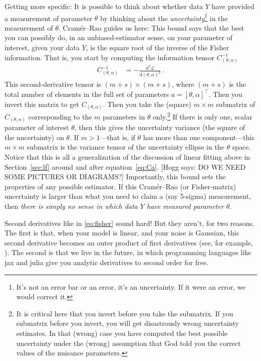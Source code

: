 \documentclass{article}
\newcommand{\sectionname}{Section}
\newcommand{\secref}[1]{\sectionname~\ref{#1}}
\newcommand{\dd}{\mathrm{d}}
\newcommand{\hogg}[1]{{\color{blue}[Hogg says: {#1}]}}
\begin{document}
Getting more specific:
It is possible to think about whether data $Y$ have provided a measurement of parameter $\theta$ by thinking about the \emph{uncertainty}\footnote{%
It's not an error bar or an error, it's an uncertainty. If it were an error, we would correct it.}
in the measurement of $\theta$.
Cram\'er--Rao guides us here:
This bound says that the best you can possibly do, in an unbiased-estimator sense, on your parameter of interest, given your data $Y$, is the square root of the inverse of the Fisher information.
That is, you start by computing the information tensor $C^{-1}_{(\theta,\alpha)}$
\begin{align}
    C^{-1}_{(\theta,\alpha)} &= - \frac{\dd^2\mathscr{L}}{\dd(\theta,\alpha)^2} ~.\label{eq:fisher}
\end{align}
This second-derivative tensor is $(m+s)\times (m+s)$, where $(m+s)$ is the total number of elements in the full set of parameters $a = [\theta,\alpha]^\top$.
Then you invert this matrix to get $C_{(\theta,\alpha)}$.
Then you take the (square) $m\times m$ submatrix of $C_{(\theta,\alpha)}$ corresponding to the $m$ parameters in $\theta$ only.\footnote{It is critical here that you invert before you take the submatrix. If you submatrix before you invert, you will get disastrously wrong uncertainty estimates. In that (wrong) case you have computed the best possible uncertainty under the (wrong) assumption that God told you the correct values of the nuisance parameters.}
If there is only one, scalar parameter of interest $\theta$, then this gives the uncertainty variance (the square of the uncertainty) on $\theta$.
If $m>1$---that is, if $\theta$ has more than one component---this $m\times m$ submatrix is the variance tensor of the uncertainty ellipse in the $\theta$ space.
Notice that this is all a generalization of the discussion of linear fitting above in \secref{sec:lf} around and after equation~\eqref{eq:Ca}.
\hogg{DO WE NEED SOME PICTURES OR DIAGRAMS?}
Importantly, this bound sets the properties of any possible estimator.
If this Cram\'er--Rao (or Fisher-matrix) uncertainty is larger than what you need to claim a (say 5-sigma) measurement, then \emph{there is simply no sense in which data $Y$ have measured parameter $\theta$}.

Second derivatives like in \eqref{eq:fisher} sound hard!
But they aren't, for two reasons.
The first is that, when your model is linear, and your noise is Gaussian, this second derivative becomes an outer product of first derivatives (see, for example, \cite{fittingaline}).
The second is that we live in the future, in which programming languages like jax \cite{jax} and julia \cite{julia} give you analytic derivatives to second order for free.
\end{document}

